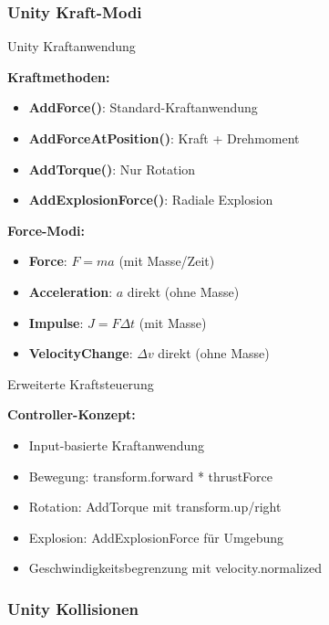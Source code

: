 \multend

\subsubsection{Unity Kraft-Modi}


\begin{definition}{Unity Kraftanwendung}

    \textbf{Kraftmethoden:}
    \begin{itemize}
        \item \textbf{AddForce()}: Standard-Kraftanwendung
        \item \textbf{AddForceAtPosition()}: Kraft + Drehmoment
        \item \textbf{AddTorque()}: Nur Rotation
        \item \textbf{AddExplosionForce()}: Radiale Explosion
    \end{itemize}
    
    \textbf{Force-Modi:}
    \begin{itemize}
        \item \textbf{Force}: $F = ma$ (mit Masse/Zeit)
        \item \textbf{Acceleration}: $a$ direkt (ohne Masse)
        \item \textbf{Impulse}: $J = F\Delta t$ (mit Masse)
        \item \textbf{VelocityChange}: $\Delta v$ direkt (ohne Masse)
    \end{itemize}
\end{definition}

\begin{concept}{Erweiterte Kraftsteuerung}

    \textbf{Controller-Konzept:}
    \begin{itemize}
        \item Input-basierte Kraftanwendung
        \item Bewegung: transform.forward * thrustForce
        \item Rotation: AddTorque mit transform.up/right
        \item Explosion: AddExplosionForce für Umgebung
        \item Geschwindigkeitsbegrenzung mit velocity.normalized
    \end{itemize}
\end{concept}

\multend

\subsubsection{Unity Kollisionen}

